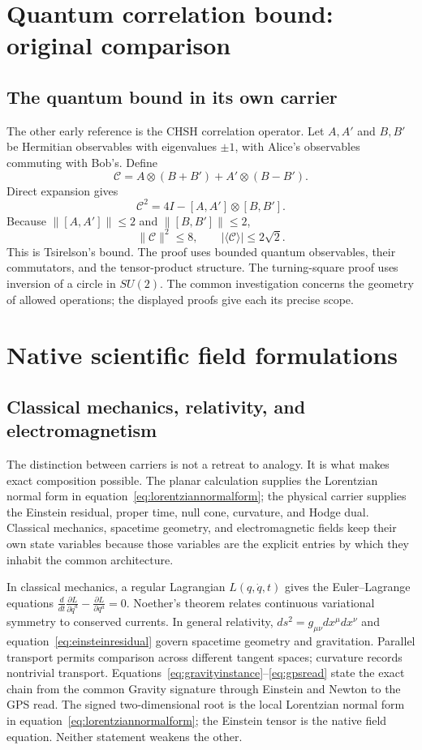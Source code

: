 \documentclass[10pt]{article}
\begin{document}
\section{Quantum correlation bound: original comparison}
\subsection*{The quantum bound in its own carrier}
The other early reference is the CHSH correlation operator.
Let $A,A'$ and $B,B'$ be Hermitian observables with eigenvalues
$\pm1$, with Alice's observables commuting with Bob's. Define
\[
\mathcal C=A\otimes(B+B')+A'\otimes(B-B').
\]
Direct expansion gives
\[
\mathcal C^2=4I-[A,A']\otimes[B,B'].
\]
Because $\|[A,A']\|\le2$ and $\|[B,B']\|\le2$,
\[
\|\mathcal C\|^2\le8,\qquad
\boxed{|\langle\mathcal C\rangle|\le2\sqrt2.}
\]
This is Tsirelson's bound. The proof uses bounded quantum
observables, their commutators, and the tensor-product structure.
The turning-square proof uses inversion of a circle in $SU(2)$.
The common investigation concerns the geometry of allowed
operations; the displayed proofs give each its precise scope.

\section{Native scientific field formulations}\label{app:fields}
\subsection*{Classical mechanics, relativity, and electromagnetism}
The distinction between carriers is not a retreat to analogy. It is what
makes exact composition possible. The planar calculation supplies the
Lorentzian normal form in equation~\eqref{eq:lorentziannormalform}; the physical
carrier supplies the Einstein residual, proper time, null cone, curvature, and
Hodge dual. Classical mechanics, spacetime geometry, and electromagnetic
fields keep their own state variables because those variables are the explicit
entries by which they inhabit the common architecture.


In classical mechanics, a regular Lagrangian $L(q,\dot q,t)$ gives the Euler--Lagrange equations $\frac{d}{dt}\frac{\partial L}{\partial\dot q^a}-\frac{\partial L}{\partial q^a}=0$. Noether's theorem relates continuous variational symmetry to conserved currents. In general relativity, $ds^2=g_{\mu\nu}dx^\mu dx^\nu$ and equation~\eqref{eq:einsteinresidual} govern spacetime geometry and gravitation. Parallel transport permits comparison across different tangent spaces; curvature records nontrivial transport. Equations~\eqref{eq:gravityinstance}--\eqref{eq:gpsread} state the exact chain from the common Gravity signature through Einstein and Newton to the GPS read. The signed two-dimensional root is the local Lorentzian normal form in equation~\eqref{eq:lorentziannormalform}; the Einstein tensor is the native field equation. Neither statement weakens the other.
\end{document}
